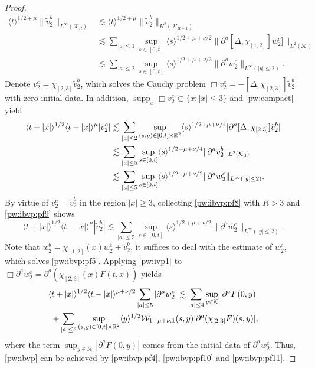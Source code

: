 \documentclass[11pt,twoside]{article}
\def\cK{\mathcal K}
\def\cW{\mathcal W}
\def\R{\mathop{\mathbb R\kern 0pt}\nolimits}
\def\ds{\displaystyle}
\def\supp{\mathop{\rm supp}\nolimits}
\def\p{\partial}
\def\supp{\operatorname{supp}}
\def\ls{\lesssim}
\newcommand{\w}[1]{\langle {#1} \rangle}
\theoremstyle{plain}
\theoremstyle{definition}
\numberwithin{equation}{section}
\begin{document}
\begin{proof}
\begin{equation}\label{pw:ibvp:pf8}
\begin{split}
\w{t}^{1/2+\mu}\|\tilde v_2^b\|_{L^\infty(\cK_R)}
&\ls\w{t}^{1/2+\mu}\|\tilde v_2^b\|_{H^2(\cK_{R+1})}\\
&\ls\sum_{|a|\le1}\sup_{s\in[0,t]}\w{s}^{1/2+\mu+\nu/2}\|\p^a[\Delta,\chi_{[1,2]}]w_2^c]\|_{L^2(\cK)}\\
&\ls\sum_{|a|\le2}\sup_{s\in[0,t]}\w{s}^{1/2+\mu+\nu/2}\|\p^aw_2^c\|_{L^\infty(|y|\le2)}.
\end{split}
\end{equation}
Denote $v_2^c=\chi_{[2,3]}\tilde v_2^b$, which solves the Cauchy problem $\Box v_2^c=-[\Delta,\chi_{[2,3]}]\tilde v_2^b$ with zero initial data.
In addition, $\supp_x\Box v_2^c\subset\{x:|x|\le3\}$ and \eqref{pw:compact} yield
\begin{equation}\label{pw:ibvp:pf9}
\begin{split}
\w{t+|x|}^{1/2}\w{t-|x|}^{\mu}|v_2^c|
&\ls\sum_{|a|\le2}\sup_{(s,y)\in[0,t]\times\R^2}\w{s}^{1/2+\mu+\nu/4}|\p^a[\Delta,\chi_{[2,3]}]\tilde v_2^b|\\
&\ls\sum_{|a|\le5}\sup_{s\in[0,t]}\w{s}^{1/2+\mu+\nu/4}\|\p^a\tilde v_2^b\|_{L^2(\cK_3)}\\
&\ls\sum_{|a|\le5}\sup_{s\in[0,t]}\w{s}^{1/2+\mu+\nu/2}\|\p^aw_2^c\|_{L^\infty(|y|\le2)}.
\end{split}
\end{equation}
By virtue of $v_2^c=\tilde v_2^b$ in the region $|x|\ge3$, collecting \eqref{pw:ibvp:pf8} with $R>3$ and \eqref{pw:ibvp:pf9} shows
\begin{equation}\label{pw:ibvp:pf10}
\w{t+|x|}^{1/2}\w{t-|x|}^{\mu}|\tilde v_2^b|
\ls\sum_{|a|\le5}\sup_{s\in[0,t]}\w{s}^{1/2+\mu+\nu/2}\|\p^aw_2^c\|_{L^\infty(|y|\le2)}.
\end{equation}
Note that $w_2^b=\chi_{[1,2]}(x)w_2^c+\tilde v_2^b$, it suffices to deal with the estimate of $w_2^c$, which solves \eqref{pw:ibvp:pf5}.
Applying \eqref{pw:ivp1} to $\Box\p^aw_2^c=\p^a(\chi_{[2,3]}(x)F(t,x))$ yields
\begin{equation}\label{pw:ibvp:pf11}
\begin{split}
\w{t+|x|}^{1/2}\w{t-|x|}^{\mu+\nu/2}\sum_{|a|\le5}|\p^aw_2^c|\ls\sum_{|a|\le4}\sup_{y\in\cK}|\p^aF(0,y)|\\
+\sum_{|a|\le5}\sup_{(s,y)\in[0,t]\times\R^2}\w{y}^{1/2}\cW_{1+\mu+\nu,1}(s,y)|\p^a(\chi_{[2,3]}F)(s,y)|,
\end{split}
\end{equation}
where the term $\ds\sup_{y\in\cK}|\p^aF(0,y)|$ comes from the initial data of $\p^aw_2^c$.
Thus, \eqref{pw:ibvp} can be achieved by \eqref{pw:ibvp:pf4}, \eqref{pw:ibvp:pf10} and \eqref{pw:ibvp:pf11}.


\end{proof}
\end{document}
